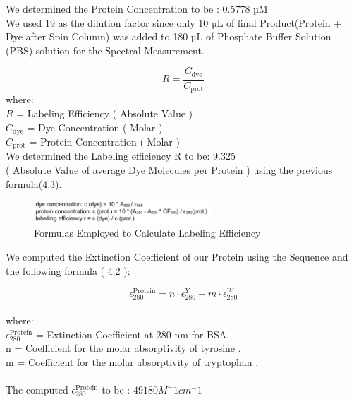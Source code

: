 \documentclass[a4paper,english,12pt,bibliography=totoc]{scrreprt}
\begin{document}
We determined the Protein Concentration to be :  0.5778 µM\\

We used 19 as the dilution factor since only 10 µL of final Product(Protein + Dye after Spin Column) was added to 180 µL of Phosphate Buffer Solution (PBS) solution for the Spectral Measurement.

\begin{equation}
R = \frac{C_{\text{dye}}}{C_{\text{prot}}}
\end{equation}
where:\\

$R$ = Labeling Efficiency ( Absolute Value )\\
$C_{\text{dye}}$ = Dye Concentration ( Molar )\\
$C_{\text{prot}}$ = Protein Concentration ( Molar )\\

We determined the Labeling efficiency  R to be:  9.325 \\
( Absolute Value of average Dye Molecules per Protein ) using the previous formula(4.3).





\begin{figure}[H]
    \centering
    \includegraphics[width=0.6\textwidth]{labelingefficiency.png}
    \caption{Formulas Employed to Calculate Labeling Efficiency}
    \label{fig:ViolinPlot}
\end{figure}

We computed the Extinction Coefficient of our Protein using the Sequence and the following formula ( 4.2 ):

\begin{equation}
    \epsilon_{280}^{\text{Protein}} = n \cdot \epsilon_{280}^Y + m \cdot \epsilon_{280}^W
\end{equation}
\\
where:\\
$\epsilon_{280}^{\text{Protein}}$  =  Extinction Coefficient at 280 nm for BSA.\\
n = Coefficient for the molar absorptivity of tyrosine .\\
m = Coefficient for the molar absorptivity of tryptophan .\\
\\
The computed $\epsilon_{280}^{\text{Protein}}$ to be : $49180 M^-1cm^-1$ \\
\end{document}
